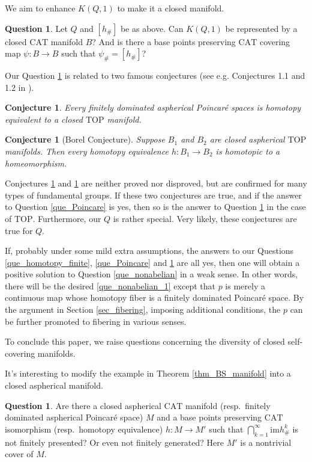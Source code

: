 \documentclass[12pt]{amsart}
\theoremstyle{plain}
\newtheorem{conjecture}[theorem]{Conjecture}
\theoremstyle{definition}
\theoremstyle{question}
\newtheorem{question}[theorem]{Question}
\theoremstyle{remark}
\theoremstyle{assumption}
\numberwithin{equation}{section}
\theoremstyle{bigthm}
\begin{document}
We aim to enhance $K(Q,1)$ to make it a closed manifold.
\begin{question}\label{que_manifold}
Let $Q$ and $[h_{\#}]$ be as above. Can $K(Q,1)$ be represented by a closed $\mathrm{CAT}$ manifold $B$? And is there a base points preserving $\mathrm{CAT}$ covering map $\psi \colon  B \rightarrow B$ such that $\psi_{\#} = [h_{\#}]$?
\end{question}

Our Question \ref{que_manifold} is related to two famous conjectures (see e.g. Conjectures 1.1 and 1.2 in \cite{Luck}).
\begin{conjecture}\label{cjt_Poincare}
Every finitely dominated aspherical Poincar\'{e} spaces is homotopy equivalent to a closed $\mathrm{TOP}$ manifold.
\end{conjecture}

\begin{conjecture}[Borel Conjecture]\label{cjt_Borel}
Suppose $B_{1}$ and $B_{2}$ are closed aspherical $\mathrm{TOP}$ manifolds. Then every homotopy equivalence $h \colon  B_{1} \rightarrow B_{2}$ is homotopic to a homeomorphism.
\end{conjecture}

Conjectures \ref{cjt_Poincare} and \ref{cjt_Borel} are neither proved nor disproved, but are confirmed for many types of fundamental groups. If these two conjectures are true, and if the answer to Question \ref{que_Poincare} is yes, then so is the answer to Question \ref{que_manifold} in the case of $\mathrm{TOP}$. Furthermore, our $Q$ is rather special. Very likely, these conjectures are true for $Q$.

If, probably under some mild extra assumptions, the answers to our Questions \ref{que_homotopy_finite}, \ref{que_Poincare} and \ref{que_manifold} are all yes, then one will obtain a positive solution to Question \ref{que_nonabelian} in a weak sense. In other words, there will be the desired \eqref{que_nonabelian_1} except that $p$ is merely a continuous map whose homotopy fiber is a finitely dominated Poincar\'{e} space. By the argument in Section \ref{sec_fibering}, imposing additional conditions, the $p$ can be further promoted to fibering in various senses.

To conclude this paper, we raise questions concerning the diversity of closed self-covering manifolds.

It's interesting to modify the example in Theorem \ref{thm_BS_manifold} into a closed aspherical manifold.
\begin{question}\label{que_aspherical}
Are there a closed aspherical $\mathrm{CAT}$ manifold (resp.~finitely dominated aspherical Poincar\'{e} space) $M$ and a base points preserving $\mathrm{CAT}$ isomorphism (resp.~homotopy equivalence) $h \colon  M \rightarrow M'$ such that $\bigcap_{k=1}^{\infty} \mathrm{im} h_{\#}^{k}$ is not finitely presented? Or even not finitely generated? Here $M'$ is a nontrivial cover of $M$.
\end{question}
\end{document}
